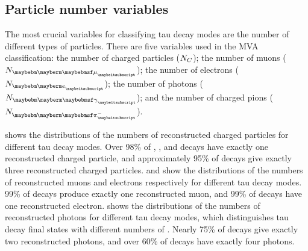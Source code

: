 \subsection{Particle number variables}

The most crucial variables for classifying tau decay modes  are the number of different types of particles. There are five variables used in the MVA classification: the number of charged particles (${N}_{C}$); the number of muons (${N}_{\Pmu}$); the number of electrons (${N}_{\Pe}$); the number of photons (${N}_{\Pgg}$); and the number of charged pions (${N}_{\Pgpm}$).



 shows the distributions of the numbers of reconstructed charged particles for different tau decay modes. Over 98\% of  \tauToElectron, \tauToMuon, and \tauToPion decays have exactly one reconstructed charged particle, and approximately 95\% of \decayAiPionShort decays give exactly three reconstructed charged particles.  and   show the distributions of the numbers of reconstructed muons and electrons respectively for different tau decay modes. 99\% of \tauToMuon decays produce exactly one reconstructed muon, and 99\% of \tauToElectron decays have one reconstructed electron.  shows the distributions of the numbers of reconstructed photons  for different tau decay modes, which distinguishes tau decay final states with different numbers of \Ppizero.  Nearly 75\% of  \decayRhoShort  decays give exactly two reconstructed photons, and over 60\% of \decayAiPhotonShort decays have exactly four photons.




